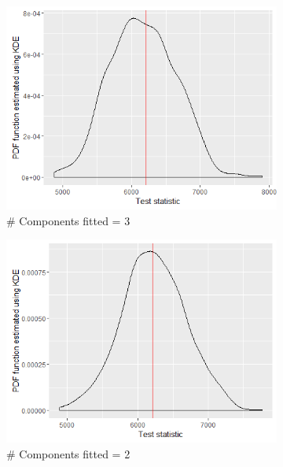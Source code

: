 \begin{figure}[!htb]
\begin{subfigure}[b]{0.4\textwidth}
		\includegraphics[width=\textwidth]{mainmatter/chapter_5_simulation_study/ppc_5wellsep3comp.png}
          \caption{\label{fig : ppc_5wellsep3comp}\# Components fitted = 3}
	\end{subfigure}
	\begin{subfigure}[b]{0.4\textwidth}
		\includegraphics[width=\textwidth]{mainmatter/chapter_5_simulation_study/ppc_5wellsep2comp.png}
          \caption{\label{fig : ppc_5wellsep2comp}\# Components fitted = 2}
	\end{subfigure}
	\begin{subfigure}[b]{0.4\textwidth}

\end{subfigure}
\end{figure}
